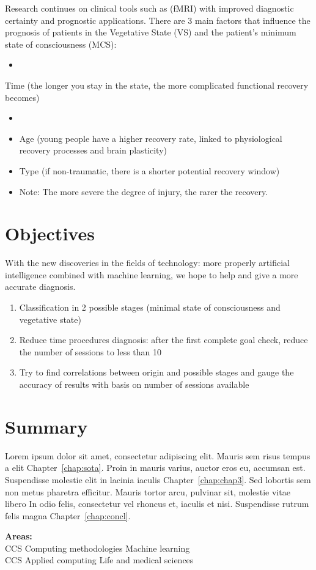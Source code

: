 Research continues on clinical tools such as (fMRI) with improved diagnostic certainty and prognostic applications. There are 3 main factors that influence the prognosis of patients in the Vegetative State (VS) and the patient's minimum state of consciousness (MCS):
\begin{itemize}
\item 
\end{itemize}
Time (the longer you stay in the state, the more complicated functional recovery becomes)
\begin{itemize}
\item 
\end{itemize}
\begin{itemize}
\item Age (young people have a higher recovery rate, linked to physiological recovery processes and brain plasticity)
\item Type (if non-traumatic, there is a shorter potential recovery window)
\item Note: The more severe the degree of injury, the rarer the recovery.
\end{itemize}


\section{Objectives} \label{sec:objectives}
With the new discoveries in the fields of technology: more properly artificial intelligence combined with machine learning, we hope to help and give a more accurate diagnosis.
\begin{enumerate}
    \item Classification in 2 possible stages (minimal state of consciousness and vegetative state)
    \item Reduce time procedures diagnosis: after the first complete goal check, reduce the number of sessions to less than 10
    \item Try to find correlations between origin and possible stages and gauge the accuracy of results with basis on number of sessions available
\end{enumerate}
\espaco



\section{Summary} \label{sec:struct}

Lorem ipsum dolor sit amet, consectetur adipiscing elit.
Mauris sem risus tempus a elit Chapter~\ref{chap:sota}.
Proin in mauris varius, auctor eros eu, accumsan est.
Suspendisse molestie elit in lacinia iaculis Chapter~\ref{chap:chap3}.
Sed lobortis sem non metus pharetra efficitur. Mauris tortor arcu,
pulvinar sit, molestie vitae libero %
In odio felis, consectetur vel rhoncus et, iaculis et nisi.
Suspendisse rutrum felis magna Chapter~\ref{chap:concl}.


\textbf{Areas: }\\ CCS \textrightarrow   Computing \hspace{0.1cm} methodologies \textrightarrow  Machine\hspace{0.1cm} learning \\ CCS \textrightarrow   Applied \hspace{0.1cm}computing \textrightarrow    Life\hspace{0.1cm} and \hspace{0.1cm}medical \hspace{0.1cm}sciences

 